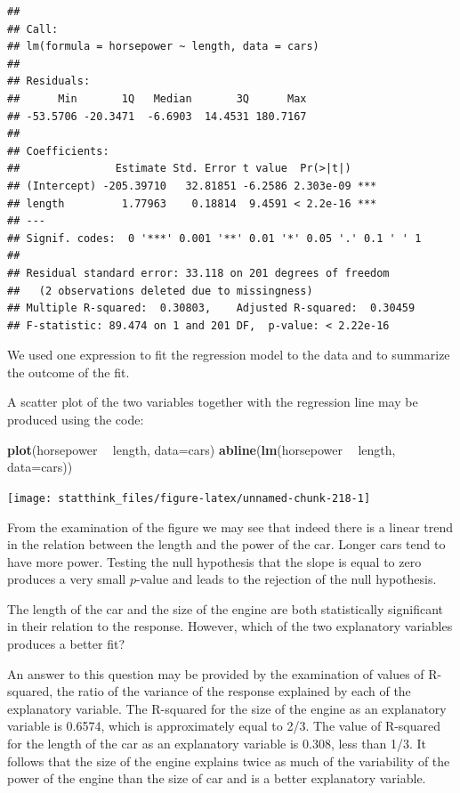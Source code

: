 \documentclass[]{krantz}
\makeatletter
\newenvironment{Shaded}{\begin{snugshade}}{\end{snugshade}}
\newcommand{\DataTypeTok}[1]{\textcolor[rgb]{0.13,0.29,0.53}{#1}}
\newcommand{\KeywordTok}[1]{\textcolor[rgb]{0.13,0.29,0.53}{\textbf{#1}}}
\newcommand{\NormalTok}[1]{#1}
\newcommand{\OperatorTok}[1]{\textcolor[rgb]{0.81,0.36,0.00}{\textbf{#1}}}
\newcommand{\StringTok}[1]{\textcolor[rgb]{0.31,0.60,0.02}{#1}}
\newenvironment{kframe}{%
\medskip{}
\setlength{\fboxsep}{.8em}
 \def\at@end@of@kframe{}%
 \ifinner\ifhmode%
  \def\at@end@of@kframe{\end{minipage}}%
  \begin{minipage}{\columnwidth}%
 \fi\fi%
 \def\FrameCommand##1{\hskip\@totalleftmargin \hskip-\fboxsep
 \colorbox{shadecolor}{##1}\hskip-\fboxsep
     \hskip-\linewidth \hskip-\@totalleftmargin \hskip\columnwidth}%
 \MakeFramed {\advance\hsize-\width
   \@totalleftmargin\z@ \linewidth\hsize
   \@setminipage}}%
 {\par\unskip\endMakeFramed%
 \at@end@of@kframe}
\renewenvironment{Shaded}{\begin{kframe}}{\end{kframe}}
\theoremstyle{definition}
\theoremstyle{definition}
\theoremstyle{definition}
\theoremstyle{remark}
\makeatother
\begin{document}
\begin{verbatim}
## 
## Call:
## lm(formula = horsepower ~ length, data = cars)
## 
## Residuals:
##      Min       1Q   Median       3Q      Max 
## -53.5706 -20.3471  -6.6903  14.4531 180.7167 
## 
## Coefficients:
##               Estimate Std. Error t value  Pr(>|t|)    
## (Intercept) -205.39710   32.81851 -6.2586 2.303e-09 ***
## length         1.77963    0.18814  9.4591 < 2.2e-16 ***
## ---
## Signif. codes:  0 '***' 0.001 '**' 0.01 '*' 0.05 '.' 0.1 ' ' 1
## 
## Residual standard error: 33.118 on 201 degrees of freedom
##   (2 observations deleted due to missingness)
## Multiple R-squared:  0.30803,    Adjusted R-squared:  0.30459 
## F-statistic: 89.474 on 1 and 201 DF,  p-value: < 2.22e-16
\end{verbatim}

We used one expression to fit the regression model to the data and to
summarize the outcome of the fit.

A scatter plot of the two variables together with the regression line may be produced
using the code:

\begin{Shaded}
\begin{Highlighting}[]
\KeywordTok{plot}\NormalTok{(horsepower }\OperatorTok{~}\StringTok{ }\NormalTok{length, }\DataTypeTok{data=}\NormalTok{cars)}
\KeywordTok{abline}\NormalTok{(}\KeywordTok{lm}\NormalTok{(horsepower }\OperatorTok{~}\StringTok{ }\NormalTok{length, }\DataTypeTok{data=}\NormalTok{cars))}
\end{Highlighting}
\end{Shaded}

\begin{center}\texttt{[image: statthink\_files/figure-latex/unnamed-chunk-218-1]} \end{center}

From the examination of the figure we may see that indeed there is a
linear trend in the relation between the length and the power of the
car. Longer cars tend to have more power. Testing the null hypothesis
that the slope is equal to zero produces a very small \(p\)-value and
leads to the rejection of the null hypothesis.

The length of the car and the size of the engine are both statistically
significant in their relation to the response. However, which of the two
explanatory variables produces a better fit?

An answer to this question may be provided by the examination of values
of R-squared, the ratio of the variance of the response explained by
each of the explanatory variable. The R-squared for the size of the
engine as an explanatory variable is 0.6574, which is approximately
equal to 2/3. The value of R-squared for the length of the car as an
explanatory variable is 0.308, less than 1/3. It follows that the size
of the engine explains twice as much of the variability of the power of
the engine than the size of car and is a better explanatory variable.
\end{document}
